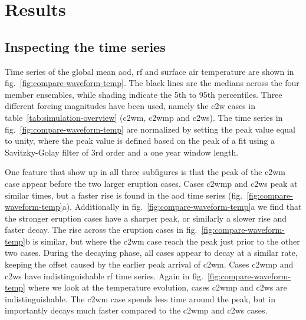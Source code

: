 \documentclass{ametsocV6.1}
\begin{document}
\section{Results}\label{sec:results}


\subsection{Inspecting the time series}

Time series of the global mean \gls{aod}, \gls{rf} and surface air temperature are shown
in fig.~\ref{fig:compare-waveform-temp}. The black lines are the medians across the four
member ensembles, while shading indicate the 5th to 95th percentiles. Three different
forcing magnitudes have been used, namely the \gls{c2w} cases in
table~\ref{tab:simulation-overview} (\gls{c2wm}, \gls{c2wmp} and \gls{c2ws}). The time
series in fig.~\ref{fig:compare-waveform-temp} are normalized by setting the peak value
equal to unity, where the peak value is defined based on the peak of a fit using a
Savitzky-Golay filter of 3rd order and a one year window length.

One feature that show up in all three subfigures is that the peak of the \gls{c2wm} case
appear before the two larger eruption cases. Cases \gls{c2wmp} and \gls{c2ws} peak at
similar times, but a faster rise is found in the \gls{aod} time series
(fig.~\ref{fig:compare-waveform-temp}a). Additionally in
fig.~\ref{fig:compare-waveform-temp}a we find that the stronger eruption cases have a
sharper peak, or similarly a slower rise and faster decay. The rise across the eruption
cases in fig.~\ref{fig:compare-waveform-temp}b is similar, but where the \gls{c2wm} case
reach the peak just prior to the other two cases. During the decaying phase, all cases
appear to decay at a similar rate, keeping the offset caused by the earlier peak arrival
of \gls{c2wm}. Cases \gls{c2wmp} and \gls{c2ws} have indistinguishable \gls{rf} time
series. Again in fig.~\ref{fig:compare-waveform-temp} where we look at the temperature
evolution, cases \gls{c2wmp} and \gls{c2ws} are indistinguishable. The \gls{c2wm} case
spends less time around the peak, but in importantly decays much faster compared to the
\gls{c2wmp} and \gls{c2ws} cases.
\end{document}
